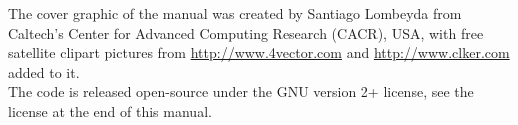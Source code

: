 The cover graphic of the manual was created by Santiago Lombeyda from
Caltech's Center for Advanced Computing Research (CACR), USA, with free satellite clipart pictures
from \url{http://www.4vector.com} and \url{http://www.clker.com} added to it.\\

The code is released open-source under the GNU version 2+ license, see the license at the end of this manual.\\

